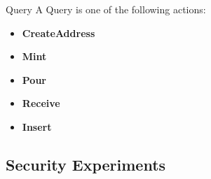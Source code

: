 {\color{blue}
\begin{definitiontoc}{Query}
    A Query is one of the following actions:
    \begin{itemize}
        \item \textbf{CreateAddress}
        \item \textbf{Mint}
        \item \textbf{Pour}
        \item \textbf{Receive}
        \item \textbf{Insert}
    \end{itemize}
\end{definitiontoc}
}


\subsection{Security Experiments}

